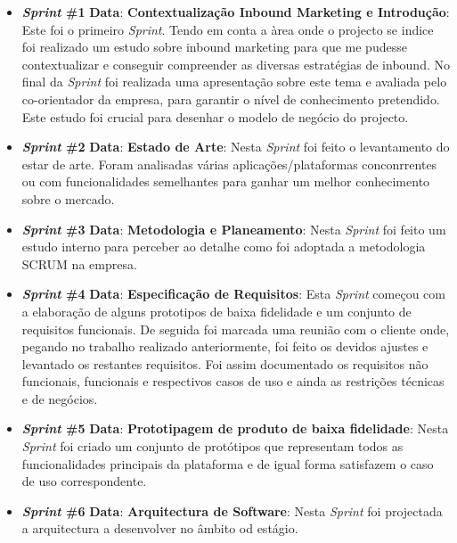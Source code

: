 \begin{itemize}
	\item \textbf{\textit{Sprint} \#1}
		\subitem \textbf{Data}:
		\subitem \textbf{Contextualização Inbound Marketing e Introdução}: Este foi o primeiro \textit{Sprint}. Tendo em conta a àrea onde o projecto se indice foi realizado um estudo sobre inbound marketing para que me pudesse contextualizar e conseguir compreender as diversas estratégias de inbound. No final da \textit{Sprint} foi realizada uma apresentação sobre este tema e avaliada pelo co-orientador da empresa, para garantir o nível de conhecimento pretendido. Este estudo foi crucial para desenhar o modelo de negócio do projecto.
	\item \textbf{\textit{Sprint} \#2}
		\subitem \textbf{Data}:
		\subitem \textbf{Estado de Arte}: Nesta \textit{Sprint} foi feito o levantamento do estar de arte. Foram analisadas várias aplicações/plataformas conconrrentes ou com funcionalidades semelhantes para ganhar um melhor conhecimento sobre o mercado.
	\item \textbf{\textit{Sprint} \#3} 
		\subitem \textbf{Data}:
		\subitem \textbf{Metodologia e Planeamento}: Nesta \textit{Sprint} foi feito um estudo interno para perceber ao detalhe como foi adoptada a metodologia SCRUM na empresa.
	\item \textbf{\textit{Sprint} \#4} 
		\subitem \textbf{Data}:
		\subitem \textbf{Especificação de Requisitos}: Esta \textit{Sprint} começou com a elaboração de alguns prototipos de baixa fidelidade e um conjunto de requisitos funcionais. De seguida foi marcada uma reunião com o cliente onde, pegando no trabalho realizado anteriormente, foi feito os devidos ajustes e levantado os restantes requisitos. Foi assim documentado os requisitos não funcionais, funcionais e respectivos casos de uso e ainda as restrições técnicas e de negócios.
	\item \textbf{\textit{Sprint} \#5} 
		\subitem \textbf{Data}:
		\subitem \textbf{Prototipagem de produto de baixa fidelidade}: Nesta \textit{Sprint} foi criado um conjunto de protótipos que representam todos as funcionalidades principais da plataforma e de igual forma satisfazem o caso de uso correspondente.
	\item \textbf{\textit{Sprint} \#6}  
		\subitem \textbf{Data}:
		\subitem \textbf{Arquitectura de Software}: Nesta \textit{Sprint} foi projectada a arquitectura a desenvolver no âmbito od estágio.
\end{itemize}

